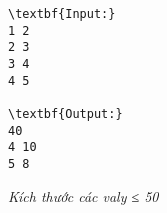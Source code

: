 \begin{verbatim}
\textbf{Input:}
1 2
2 3
3 4
4 5

\textbf{Output:}
40
4 10
5 8\end{verbatim}

\emph{Kích thước các valy ≤ 50}

 